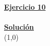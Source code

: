 \indent\underline{\textbf{Ejercicio 10}}\\
\lipsum[4]\\

\indent\underline{\textbf{Solución}}\\

\line(1,0){\textwidth}
